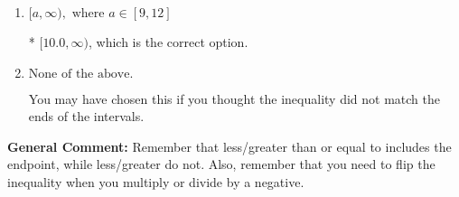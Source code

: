 \documentclass{extbook}[14pt]
\begin{document}
\begin{enumerate}
{\begin{enumerate}[label=\Alph*.]
 $[-10.0, \infty)$, which corresponds to negating the endpoint of the solution.
\item \( [a, \infty), \text{ where } a \in [9, 12] \)

* $[10.0, \infty)$, which is the correct option.
\item \( \text{None of the above}. \)

You may have chosen this if you thought the inequality did not match the ends of the intervals.
\end{enumerate}

\textbf{General Comment:} Remember that less/greater than or equal to includes the endpoint, while less/greater do not. Also, remember that you need to flip the inequality when you multiply or divide by a negative.
}
\end{enumerate}
\end{document}
